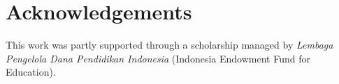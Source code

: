 \documentclass[11pt, a4paper]{report} \usepackage[titletoc]{appendix}
\begin{document}
\cleardoublepage
\listoffigures
{}

\cleardoublepage
\listoftables
{}

\cleardoublepage
\lstlistoflistings
{}

\cleardoublepage
%
%
%
%
%
%
%

\cleardoublepage
\chapter*{Acknowledgements}
This work was partly supported through a scholarship managed by 
\emph{Lembaga Pengelola Dana Pendidikan Indonesia}
(Indonesia Endowment Fund for Education).

%
%
%
\end{document}
